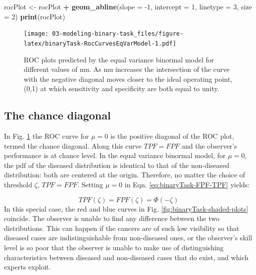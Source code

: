 \documentclass[
]{book}
\newenvironment{Shaded}{\begin{snugshade}}{\end{snugshade}}
\newcommand{\DataTypeTok}[1]{\textcolor[rgb]{0.13,0.29,0.53}{#1}}
\newcommand{\DecValTok}[1]{\textcolor[rgb]{0.00,0.00,0.81}{#1}}
\newcommand{\KeywordTok}[1]{\textcolor[rgb]{0.13,0.29,0.53}{\textbf{#1}}}
\newcommand{\NormalTok}[1]{#1}
\newcommand{\OperatorTok}[1]{\textcolor[rgb]{0.81,0.36,0.00}{\textbf{#1}}}
\newcommand{\StringTok}[1]{\textcolor[rgb]{0.31,0.60,0.02}{#1}}
\begin{document}
\begin{Shaded}
\begin{Highlighting}[]
\NormalTok{rocPlot \textless{}{-}}\StringTok{ }\NormalTok{rocPlot }\OperatorTok{+}\StringTok{ }\KeywordTok{geom\_abline}\NormalTok{(}\DataTypeTok{slope =} \DecValTok{{-}1}\NormalTok{, }\DataTypeTok{intercept =} \DecValTok{1}\NormalTok{, }\DataTypeTok{linetype =} \DecValTok{3}\NormalTok{, }\DataTypeTok{size =} \DecValTok{2}\NormalTok{)}
\KeywordTok{print}\NormalTok{(rocPlot)}
\end{Highlighting}
\end{Shaded}

\begin{figure}
\centering
\texttt{[image: 03-modeling-binary-task\_files/figure-latex/binaryTask-RocCurvesEqVarModel-1.pdf]}
\caption{\label{fig:binaryTask-RocCurvesEqVarModel}ROC plots predicted by the equal variance binormal model for different values of mu. As mu increases the intersection of the curve with the negative diagonal moves closer to the ideal operating point, (0,1) at which sensitivity and specificity are both equal to unity.}
\end{figure}

\hypertarget{the-chance-diagonal}{%
\subsection{The chance diagonal}\label{the-chance-diagonal}}

In Fig. \ref{fig:binaryTask-RocCurvesEqVarModel} the ROC curve for \(\mu=0\) is the positive diagonal of the ROC plot, termed the chance diagonal. Along this curve \(TPF = FPF\) and the observer's performance is at chance level. In the equal variance binormal model, for \(\mu=0\), the pdf of the diseased distribution is identical to that of the non-diseased distribution: both are centered at the origin. Therefore, no matter the choice of threshold \(\zeta\), \(TPF = FPF\). Setting \(\mu=0\) in Eqn. \eqref{eq:binaryTask-FPF-TPF} yields:

\[TPF\left ( \zeta \right )=FPF\left ( \zeta \right )=\Phi\left ( -\zeta \right )\]
In this special case, the red and blue curves in Fig. \ref{fig:binaryTask-shaded-plots} coincide. The observer is unable to find any difference between the two distributions. This can happen if the cancers are of such low visibility so that diseased cases are indistinguishable from non-diseased ones, or the observer's skill level is so poor that the observer is unable to make use of distinguishing characteristics between diseased and non-diseased cases that do exist, and which experts exploit.
\end{document}

